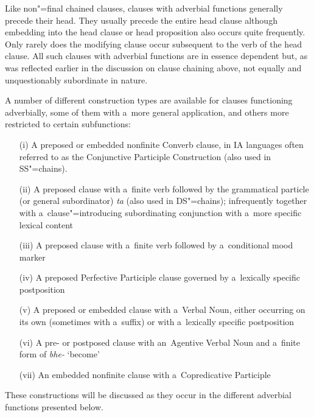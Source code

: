 Like non"=final chained clauses, clauses with adverbial functions generally precede their head. They usually precede the entire head clause although embedding into the head clause or head proposition also occurs quite frequently. Only rarely does the modifying clause occur subsequent to the verb of the head clause. All such clauses with adverbial functions are in essence dependent but, as was reflected earlier in the discussion on clause chaining above, not equally and unquestionably subordinate in nature. 



A number of different construction types are available for clauses functioning adverbially, some of them with a~more general application, and others more restricted to certain subfunctions:


\begin{enumerate}
\item[(i)] A preposed or embedded nonfinite Converb clause, in IA languages often referred to as the Conjunctive Participle Construction (also used in SS"=chains).

\item[(ii)] A preposed clause with a~finite verb followed by the grammatical particle (or general subordinator) \textit{ta} (also used in DS"=chains); infrequently together with a~clause"=introducing subordinating conjunction with a~more specific lexical content

\item[(iii)] A preposed clause with a~finite verb followed by a~conditional mood marker

\item[(iv)] A preposed Perfective Participle clause governed by a~lexically specific postposition

\item[(v)] A preposed or embedded clause with a~Verbal Noun, either occurring on its own (sometimes with a~suffix) or with a~lexically specific postposition

\item[(vi)] A pre- or postposed clause with an~Agentive Verbal Noun and a~finite form of \textit{bhe-} `become'

\item[(vii)] An embedded nonfinite clause with a~Copredicative Participle
\end{enumerate}

These constructions will be discussed as they occur in the different adverbial functions presented below. 



